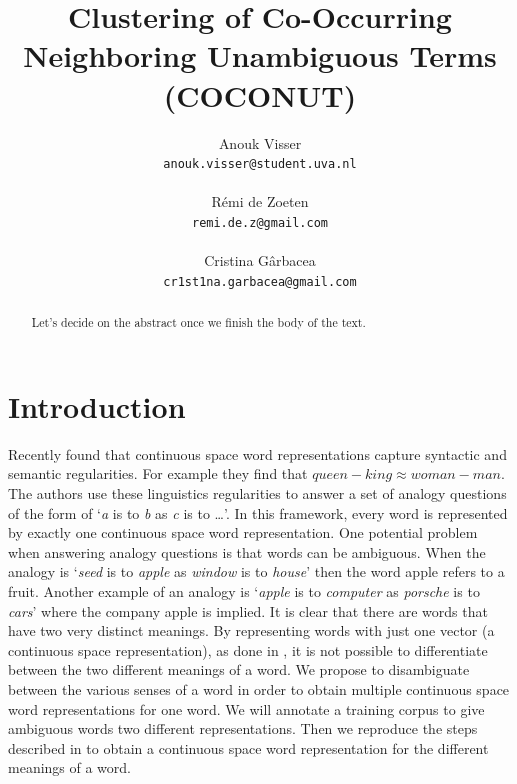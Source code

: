 \documentclass[11pt]{article}
\title{Clustering of Co-Occurring Neighboring Unambiguous Terms (COCONUT)}
\author{
Anouk Visser \\
{\tt anouk.visser@student.uva.nl}\\
  \\\And
  R\'emi de Zoeten \\
  {\tt remi.de.z@gmail.com}\\
   \\\And
  Cristina G\^arbacea \\
  {\tt cr1st1na.garbacea@gmail.com}
  \\}
\date{}
\begin{document}
\maketitle
\begin{abstract}
Let's decide on the abstract once we finish the body of the text.
\end{abstract}

\section{Introduction}
Recently \cite{Mikolov:13} found that continuous space word representations capture syntactic and semantic regularities. For example they find that $\textit{queen} - \textit{king} \approx \textit{woman}  -\textit{man}$. The authors use these linguistics regularities to answer a set of analogy questions of the form of `\textit{a} is to \textit{b} as \textit{c} is to \dots'. In this framework, every word is represented by exactly one continuous space word representation. One potential problem when answering analogy questions is that words can be ambiguous. When the analogy is `\textit{seed} is to \textit{apple} as \textit{window} is to \textit{house}' then the word apple refers to a fruit. Another example of an analogy is `\textit{apple} is to \textit{computer} as \textit{porsche} is to \textit{cars}' where the company apple is implied. It is clear that there are words that have two very distinct meanings. By representing words with just one vector (a continuous space representation), as done in \cite{Mikolov:13}, it is not possible to differentiate between the two different meanings of a word. We propose to disambiguate between the various senses of a word in order to obtain multiple continuous space word representations for one word. We will annotate a training corpus to give ambiguous words two different representations. Then we reproduce the steps described in \cite{Mikolov:13} to obtain a continuous space word representation for the different meanings of a word.
\end{document}
